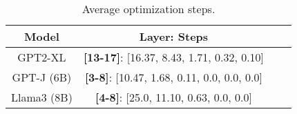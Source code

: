 \begin{table}[t]
   \centering
   \caption{Average optimization steps.}
    \begin{tabular}{cccc}
        \toprule
        Model   & \textbf{Layer}: Steps \\
        \midrule
        GPT2-XL & \textbf{[13-17]}: [16.37, 8.43, 1.71, 0.32, 0.10] \\
        GPT-J (6B)    & \textbf{[3-8]}: [10.47, 1.68, 0.11, 0.0, 0.0, 0.0] \\
         Llama3 (8B)  & \textbf{[4-8]}: [25.0, 11.10, 0.63, 0.0, 0.0] \\
        \bottomrule
    \end{tabular}
\label{tab:optimization-steps}
\end{table}